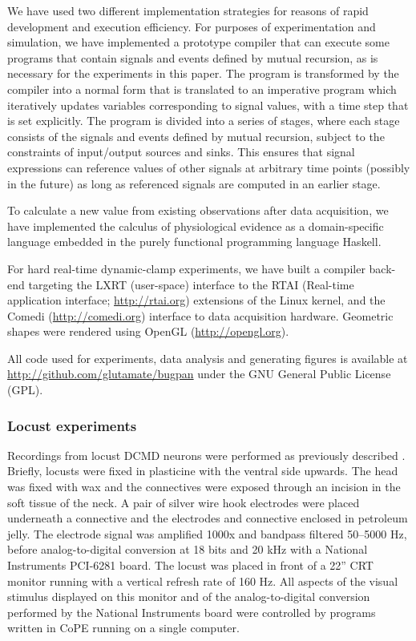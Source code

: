 \documentclass[11pt]{article}
\begin{document}
We have used two different implementation strategies for reasons of
rapid development and execution efficiency. For purposes of
experimentation and simulation, we have implemented a prototype
compiler that can execute some programs that contain signals and
events defined by mutual recursion, as is necessary for the
experiments in this paper. The program is transformed by the compiler
into a normal form that is translated to an imperative program which
iteratively updates variables corresponding to signal values, with a
time step that is set explicitly. The program is divided into a series
of stages, where each stage consists of the signals and events defined
by mutual recursion, subject to the constraints of input/output
sources and sinks. This ensures that signal expressions can reference
values of other signals at arbitrary time points (possibly in the
future) as long as referenced signals are computed in an earlier
stage.

To calculate a new value from existing observations after data
acquisition, we have implemented the calculus of physiological
evidence as a domain-specific language embedded in the purely functional
programming language Haskell.

For hard real-time dynamic-clamp experiments, we have built a compiler
back-end targeting the LXRT (user-space) interface to the RTAI (Real-time
application interface; \url{http://rtai.org}) extensions of the Linux
kernel, and the Comedi (\url{http://comedi.org}) interface to data
acquisition hardware. Geometric shapes were rendered using OpenGL
(\url{http://opengl.org}).

All code used for experiments, data analysis and generating figures is
available at \url{http://github.com/glutamate/bugpan} under the GNU General
Public License (GPL).

\subsubsection*{Locust experiments}

Recordings from locust DCMD neurons were performed as previously
described \citep{Matheson2004}. Briefly, locusts were fixed in
plasticine with the ventral side upwards. The head was fixed with wax
and the connectives were exposed through an
incision in the soft tissue of the neck. A pair of silver wire hook
electrodes were placed underneath a connective and the electrodes
and connective enclosed in petroleum jelly. The electrode signal was
amplified 1000x and bandpass filtered 50--5000 Hz, before
analog-to-digital conversion at 18 bits and 20 kHz with a National
Instruments PCI-6281 board. The locust was placed in front of a 22''
CRT monitor running with a vertical refresh rate of 160 Hz. All
aspects of the visual stimulus displayed on this monitor and of
the analog-to-digital conversion performed by the National Instruments
board were controlled by programs written in
CoPE running on a single computer.
\end{document}
